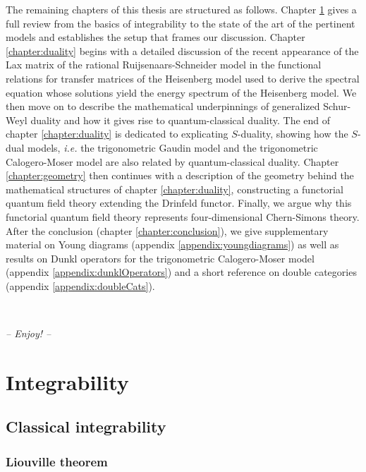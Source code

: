 \documentclass[11pt]{report}
\theoremstyle{definition}
\theoremstyle{remark}
\theoremstyle{remark}
\begin{document}
The remaining chapters of this thesis are structured as follows. Chapter \ref{chapter:integrability} gives a full review from the basics of integrability to the state of the art of the pertinent models and establishes the setup that frames our discussion. Chapter \ref{chapter:duality} begins with a detailed discussion of the recent appearance of the Lax matrix of the rational Ruijsenaars-Schneider model in the functional relations for transfer matrices of the Heisenberg model used to derive the spectral equation whose solutions yield the energy spectrum of the Heisenberg model. We then move on to describe the mathematical underpinnings of generalized Schur-Weyl duality and how it gives rise to quantum-classical duality. The end of chapter \ref{chapter:duality} is dedicated to explicating $S$-duality, showing how the $S$-dual models, \emph{i.e.} the trigonometric Gaudin model and the trigonometric Calogero-Moser model are also related by quantum-classical duality. Chapter \ref{chapter:geometry} then continues with a description of the geometry behind the mathematical structures of chapter \ref{chapter:duality}, constructing a functorial quantum field theory extending the Drinfeld functor. Finally, we argue why this functorial quantum field theory represents four-dimensional Chern-Simons theory. After the conclusion (chapter \ref{chapter:conclusion}), we give supplementary material on Young diagrams (appendix \ref{appendix:youngdiagrams}) as well as results on Dunkl operators for the trigonometric Calogero-Moser model (appendix \ref{appendix:dunklOperators}) and a short reference on double categories (appendix \ref{appendix:doubleCats}).

~\\

\begin{center}
{\large \textit{-- Enjoy! --}}
\end{center}


\chapter{Integrability}\label{chapter:integrability}

\section{Classical integrability}

\subsection{Liouville theorem}
\end{document}
